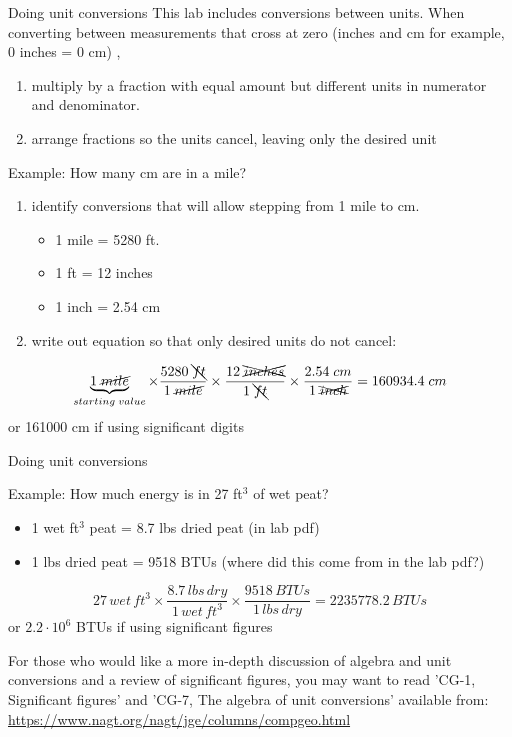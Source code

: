 \documentclass[ignorenonframetext,slidestop]{beamer}
\begin{document}
\begin{frame}{Doing unit conversions}
  This lab includes conversions between units. When converting between measurements that cross at zero \footnotesize (inches and cm for example, 0 inches = 0 cm) \normalsize,
  \begin{enumerate}
  \item multiply by a fraction with equal amount but different units in numerator and denominator. 
  \item arrange fractions so the units cancel, leaving only the desired unit
  \end{enumerate}

  \footnotesize
  \begin{block}{Example: How many cm are in a mile?}
    \begin{enumerate}
    \item identify conversions that will allow stepping from 1 mile to cm.
      \begin{itemize} \footnotesize
      \item 1 mile = 5280 ft.
      \item 1 ft = 12 inches
      \item 1 inch = 2.54 cm
      \end{itemize}
    \item write out equation so that only desired units do not cancel:
    \end{enumerate}
    \begin{equation*}
      \underbrace{1 \; \cancel{mile}}_{starting \; value} \times \frac{5280 \; \bcancel{ft}}{1 \; \cancel{mile}} \times
      \frac{12 \; \xcancel{inches}}{1 \; \bcancel{ft}} \times \frac{2.54 \; cm}{1 \; \xcancel{inch}}
      = 160934.4 \; cm
    \end{equation*}
    or 161000 cm if using significant digits
  \end{block}
\end{frame}

\begin{frame}{Doing unit conversions}
 \footnotesize
 \begin{block}{Example: How much energy is in 27 ft$^3$ of wet peat?}
   \begin{itemize}
   \item 1 wet ft$^3$ peat = 8.7 lbs dried peat (in lab pdf)
   \item 1 lbs dried peat = 9518 BTUs (where did this come from in the lab pdf?)
   \end{itemize}
   \begin{equation*}
     27 \, wet \, ft^3 \times \frac{8.7 \,lbs \,dry}{1 \,wet \,ft^3} \times \frac{9518 \,BTUs}{1 \,lbs \,dry} = 2235778.2 \, BTUs
   \end{equation*}
   or $2.2 \cdot 10^6$  BTUs if using significant figures
 \end{block}
 For those who would like a more in-depth discussion of algebra and unit conversions and a review of significant figures, you may want to read 'CG-1, Significant figures' and 'CG-7, The algebra of unit conversions' available from: \href{https://www.nagt.org/nagt/jge/columns/compgeo.html}{https://www.nagt.org/nagt/jge/columns/compgeo.html}
\end{frame}
\end{document}
